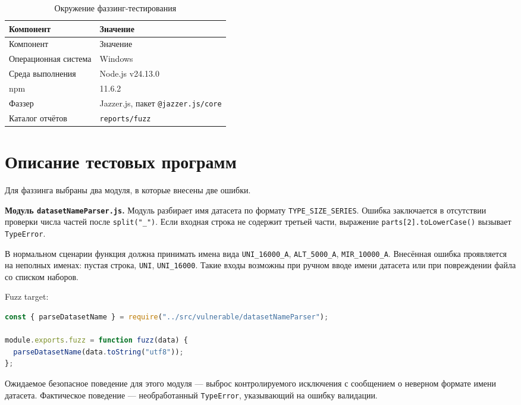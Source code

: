\noindent
\begingroup
\centering
\small
\begin{longtable}[c]{|p{5cm}|p{10cm}|}
    \caption{Окружение фаззинг-тестирования}
    \label{tab:fuzz-env}
    \\
    \hline
    Компонент & Значение \\ \hline
    \endfirsthead
    \hline
    Компонент & Значение \\ \hline
    \endhead
    \hline
    Операционная система & Windows \\ \hline
    Среда выполнения & Node.js v24.13.0 \\ \hline
    npm & 11.6.2 \\ \hline
    Фаззер & Jazzer.js, пакет \texttt{@jazzer.js/core} \\ \hline
    Каталог отчётов & \texttt{reports/fuzz} \\ \hline
\end{longtable}
\normalsize
\endgroup

\section{Описание тестовых программ} \label{ch1:sec3}

Для фаззинга выбраны два модуля, в которые внесены две ошибки.

\textbf{Модуль \texttt{datasetNameParser.js}.}
Модуль разбирает имя датасета по формату \texttt{TYPE\_SIZE\_SERIES}. Ошибка
заключается в отсутствии проверки числа частей после \texttt{split("\_")}. Если
входная строка не содержит третьей части, выражение \texttt{parts[2].toLowerCase()}
вызывает \texttt{TypeError}.

В нормальном сценарии функция должна принимать имена вида
\texttt{UNI\_16000\_A}, \texttt{ALT\_5000\_A}, \texttt{MIR\_10000\_A}. Внесённая
ошибка проявляется на неполных именах: пустая строка, \texttt{UNI}, \texttt{UNI\_16000}.
Такие входы возможны при ручном вводе имени датасета или при повреждении файла со
списком наборов.

Fuzz target:
\begin{lstlisting}[language=JavaScript,breaklines=true]
const { parseDatasetName } = require("../src/vulnerable/datasetNameParser");

module.exports.fuzz = function fuzz(data) {
  parseDatasetName(data.toString("utf8"));
};
\end{lstlisting}

Ожидаемое безопасное поведение для этого модуля --- выброс контролируемого
исключения с сообщением о неверном формате имени датасета. Фактическое поведение
--- необработанный \texttt{TypeError}, указывающий на ошибку валидации.

